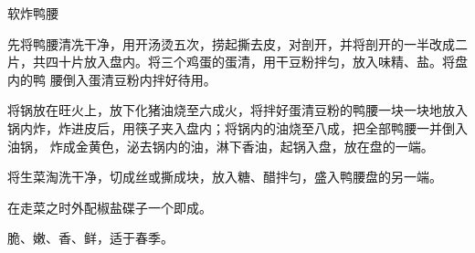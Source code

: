 %
%
%
%
%
%
%
\begin{recipe}{软炸鸭腰}

\ingredients


\preparation

\step 先将鸭腰清冼干净，用开汤烫五次，捞起撕去皮，对剖开，并将剖开的一半改成二
片，共四十片放入盘内。将三个鸡蛋的蛋清，用干豆粉拌匀，放入味精、盐。将盘内的鸭
腰倒入蛋清豆粉内拌好待用。

\step 将锅放在旺火上，放下化猪油烧至六成火，将拌好蛋清豆粉的鸭腰一块一块地放入
锅内炸，炸进皮后，用筷子夹入盘内；将锅内的油烧至八成，把全部鸭腰一并倒入油锅，
炸成金黄色，泌去锅内的油，淋下香油，起锅入盘，放在盘的一端。

\step 将生菜淘洗干净，切成丝或撕成块，放入糖、醋拌匀，盛入鸭腰盘的另一端。

\step 在走菜之时外配椒盐碟子一个即成。

\features

脆、嫩、香、鲜，适于春季。

\end{recipe}

